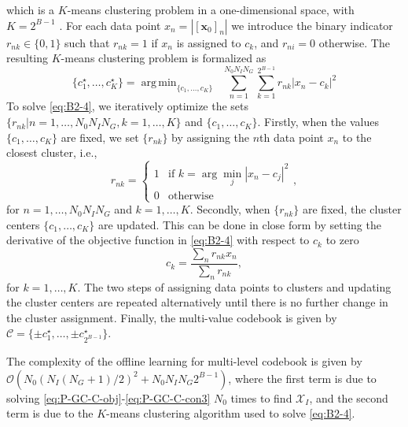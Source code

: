 \documentclass[twocolumn,10pt]{IEEEtran}
\DeclareMathOperator*{\argmin}{arg\,min}
\begin{document}
which is a $K$-means clustering problem in a one-dimensional space, with $K=2^{B-1}$ \cite{bis06}.
For each data point $x_n=\left\vert\left[\mathbf{x}_0\right]_n\right\vert$ we introduce the binary indicator $r_{nk}\in\{0,1\}$ such that $r_{nk}=1$ if $x_n$ is assigned to $c_k$, and $r_{ni}=0$ otherwise.
The resulting $K$-means clustering problem is formalized as
\begin{equation}
\{c_1^\star,\ldots,c_K^\star\}=\argmin_{\{c_1,\ldots,c_K\}}\;\;\sum_{n=1}^{N_0N_IN_G}\sum_{k=1}^{2^{B-1}}r_{nk}\left\vert x_n-c_k\right\vert^2\label{eq:B2-4}
\end{equation}
To solve \eqref{eq:B2-4}, we iteratively optimize the sets $\{r_{nk}|n=1,\ldots,N_0N_IN_G,k=1,\ldots,K\}$ and $\{c_1,\ldots,c_K\}$.
Firstly, when the values $\{c_1,\ldots,c_K\}$ are fixed, we set $\{r_{nk}\}$ by assigning the $n$th data point $x_n$ to the closest cluster, i.e.,
\begin{equation}
r_{nk}=
\begin{cases}
1 & \text{if } k=\arg \min_{j} \left\vert x_n-c_j\right\vert^2\\
0 & \text{otherwise}
\end{cases},
\end{equation}
for $n=1,\ldots,N_0N_IN_G$ and $k=1,\ldots,K$.
Secondly, when $\{r_{nk}\}$ are fixed, the cluster centers $\{c_1,\ldots,c_K\}$ are updated.
This can be done in close form by setting the derivative of the objective function in \eqref{eq:B2-4} with respect to $c_k$ to zero
\begin{equation}
c_k=\frac{\sum_n r_{nk}x_n}{\sum_n r_{nk}},
\end{equation}
for $k=1,\ldots,K$.
The two steps of assigning data points to clusters and updating the cluster
centers are repeated alternatively until there is no further change in the cluster assignment.
Finally, the multi-value codebook is given by $\mathcal{C}=\{\pm c_1^\star,\ldots,\pm c_{2^{B-1}}^\star\}$.

The complexity of the offline learning for multi-level codebook is given by $\mathcal{O}(N_0(N_I(N_G+1)/2)^2+N_0N_IN_G2^{B-1})$, where the first term is due to solving \eqref{eq:P-GC-C-obj}-\eqref{eq:P-GC-C-con3} $N_0$ times to find $\mathcal{X}_I$, and the second term is due to the $K$-means clustering algorithm used to solve \eqref{eq:B2-4}.
\end{document}
